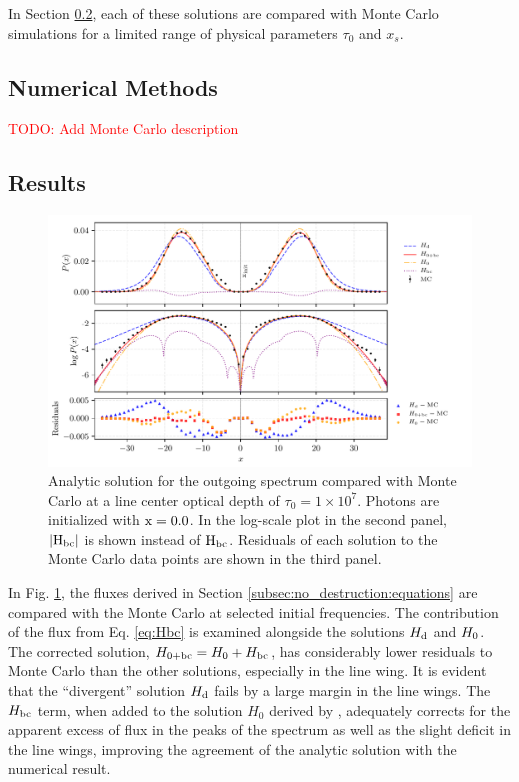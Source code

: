 \documentclass{aastex63}
\newcommand{\todo}[1]{\textcolor{red}{#1}}
\begin{document}
In Section \ref{subsec:no_destruction:results}, each of these solutions are compared with Monte Carlo simulations for a limited range of physical parameters $\tau_0$ and $x_s$.

\subsection{Numerical Methods}
\label{subsec:no_destruction:methods}

\todo{
TODO: Add Monte Carlo description
}
\subsection{Results}
\label{subsec:no_destruction:results}
\begin{figure}
    \centering
    \includegraphics{pdf_xinit0.0.pdf}
    \caption{Analytic solution for the outgoing spectrum compared with Monte Carlo at a line center optical depth of $\tau_0 = 1 \times 10^7$. Photons are initialized with $\rm x = 0.0$. In the log-scale plot in the second panel, $|\rm H_{bc}|$ is shown instead of $\rm H_{bc}$. Residuals of each solution to the Monte Carlo data points are shown in the third panel.} 
    \label{fig:sol_mc_residual_0}
\end{figure}

 In Fig. \ref{fig:sol_mc_residual_0}, the fluxes derived in Section \ref{subsec:no_destruction:equations} are compared with the Monte Carlo at selected initial frequencies. The contribution of the flux from Eq. \ref{eq:Hbc} is examined alongside the solutions $H_{\rm d}$ and $H_{\rm 0}$. The corrected solution, $H_{\rm 0 + bc} = H_{\rm 0} + H_{\rm bc}$, has considerably lower residuals to Monte Carlo than the other solutions, especially in the line wing. It is evident that the ``divergent'' solution $H_{\rm d}$ fails by a large margin in the line wings. The $H_{\rm bc}$ term, when added to the solution $H_0$ derived by \citet{2006ApJ...649...14D}, adequately corrects for the apparent excess of flux in the peaks of the spectrum as well as the slight deficit in the line wings, improving the agreement of the analytic solution with the numerical result.
 
\end{document}
